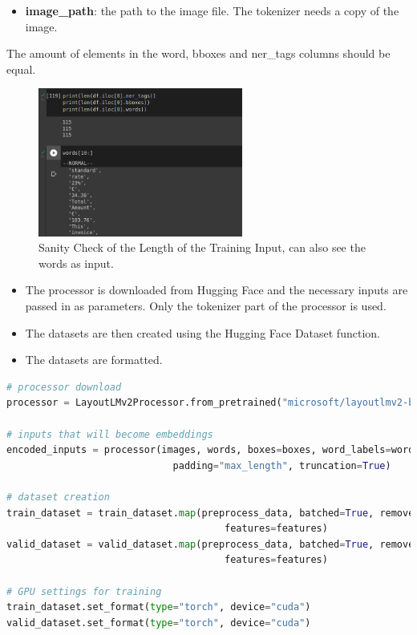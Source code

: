 \begin{itemize}
\begin{lstlisting}[language=python, label={lst:data_config}, caption={Data Config.}]
\end{lstlisting}
	\item \textbf{image\_path}: the path to the image file. The tokenizer needs a copy of the image.
\end{itemize}

The amount of elements in the word, bboxes and ner\_tags columns should be equal.
\begin{figure}[H]
	\centering
	\includegraphics[width=0.6\textwidth]{figures/len_of_train_input.png}
	\caption{Sanity Check of the Length of the Training Input, can also see the words as input.}
	\label{fig:training_dataframe_columns}
\end{figure}
\bigbreak
\begin{itemize}
	\item The processor is downloaded from Hugging Face and the necessary inputs are passed in as parameters. Only the tokenizer part of the processor
	      is used.
	\item The datasets are then created using the Hugging Face Dataset function.
	\item The datasets are formatted.
\end{itemize}
\begin{lstlisting}[language=python, label={lst:dataset_creation}, caption={Dataset Preperation.}]
# processor download 
processor = LayoutLMv2Processor.from_pretrained("microsoft/layoutlmv2-base-uncased", revision="no_ocr")

# inputs that will become embeddings
encoded_inputs = processor(images, words, boxes=boxes, word_labels=word_labels,
                             padding="max_length", truncation=True)

# dataset creation
train_dataset = train_dataset.map(preprocess_data, batched=True, remove_columns=train_dataset.column_names,
                                      features=features)
valid_dataset = valid_dataset.map(preprocess_data, batched=True, remove_columns=valid_dataset.column_names,
                                      features=features)

# GPU settings for training
train_dataset.set_format(type="torch", device="cuda")
valid_dataset.set_format(type="torch", device="cuda")
\end{lstlisting}
